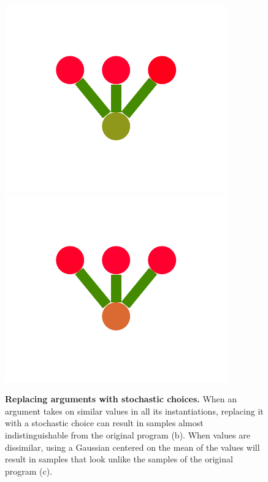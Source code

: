 \documentclass[a4paper,10pt]{article}
\begin{document}
\begin{figure}
{    \includegraphics[scale=.26]{./figures/4-2-1-noisyprog-postB-7.pdf}
    \includegraphics[scale=.26]{./figures/4-2-1-noisyprog-postB-8.pdf}
    \label{fig:noisy-bad}        
    }
  \caption{{\bf Replacing arguments with stochastic choices.} When an argument takes on similar values in all its instantiations, replacing it with a stochastic choice can result in samples almost indistinguishable from the original program (b). When values are dissimilar, using a Gaussian centered on the mean of the values will result in samples that look unlike the samples of the original program (c).}
\end{figure}
\end{document}
